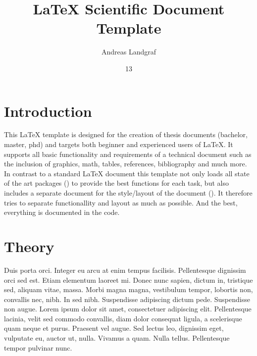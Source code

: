 \documentclass[
	english,    %
	thesis,    %
]{scientific}
\title{\LaTeX{} Scientific Document Template}
\author{Andreas Landgraf}
\date{13}{11}{2015}
\institute{Bachelor Degree Programme \par Innovation Management}
\begin{document}

\setcounter{page}{1}
\pagestyle{empty}

\maketitle
\makedeclaration

\pagestyle{scrheadings}
\tableofcontents
\clearpage
\printglossary[type=\acronymtype]
\printglossary[style=altlist]

\chapter{Introduction}

This \LaTeX{} template is designed for the creation of thesis documents (bachelor, master, phd) and targets both beginner and experienced users of \LaTeX{}. It supports all basic functionality and requirements of a technical document such as the inclusion of graphics, math, tables, references, bibliography and much more. In contrast to a standard LaTeX document this template not only loads all state of the art packages () to provide the best functions for each task, but also includes a separate document for the style/layout of the document (). It therefore tries to separate functionallity and layout as much as possible. And the best, everything is documented in the code.

\chapter{Theory}

Duis porta orci. Integer eu arcu at enim tempus facilisis. Pellentesque dignissim orci sed est. Etiam elementum laoreet mi. Donec nunc sapien, dictum in, tristique sed, aliquam vitae, massa. Morbi magna magna, vestibulum tempor, lobortis non, convallis nec, nibh. In sed nibh. Suspendisse adipiscing dictum pede. Suspendisse non augue. Lorem ipsum dolor sit amet, consectetuer adipiscing elit. Pellentesque lacinia, velit sed commodo convallis, diam dolor consequat ligula, a scelerisque quam neque et purus. Praesent vel augue. Sed lectus leo, dignissim eget, vulputate eu, auctor ut, nulla. Vivamus a quam. Nulla tellus. Pellentesque tempor pulvinar nunc.
\end{document}
